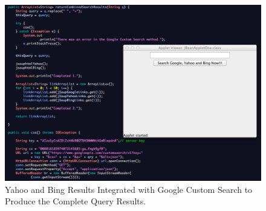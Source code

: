 \documentclass[a4paper, 11pt]{article}
\begin{document}
\begin{figure}[H]
\begin{center}
\includegraphics[scale=0.47]{Applet}
\end{center}
\caption{Yahoo and Bing Results Integrated with Google Custom Search to Produce the Complete Query Results.}
\label{AppletFig}
\end{figure}
\end{document}
